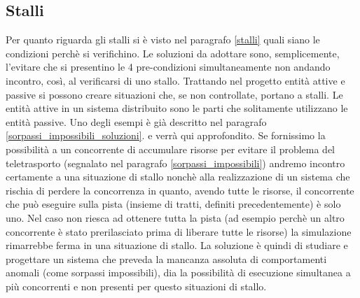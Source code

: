 \subsection{Stalli }
Per quanto riguarda gli stalli si \`{e} visto nel paragrafo \ref{stalli} quali
siano le condizioni perch\`{e} si verifichino. Le soluzioni da adottare sono,
semplicemente, l'evitare che si presentino le 4 pre-condizioni simultaneamente
non andando incontro, cos\`{i}, al verificarsi di uno stallo.
Trattando nel progetto entit\`{a} attive e passive si possono creare situazioni
che, se non controllate, portano a stalli. Le entit\`{a} attive in un sistema
distribuito sono le parti che solitamente utilizzano le entit\`{a} passive. Uno
degli esempi \`{e} gi\`{a} descritto nel paragrafo
\ref{sorpassi_impossibili_soluzioni}. e verr\`{a} qui approfondito. Se
fornissimo la possibilit\`{a} a un concorrente  di accumulare risorse per
evitare il problema del teletrasporto (segnalato nel paragrafo
\ref{sorpassi_impossibili}) andremo incontro certamente a una situazione di
stallo nonch\`{e} alla realizzazione di un sistema che rischia di perdere la
concorrenza in quanto, avendo tutte le risorse, il concorrente che pu\`{o}
eseguire sulla pista (insieme di tratti, definiti precedentemente) \`{e} solo
uno. Nel caso non riesca ad ottenere tutta la pista (ad esempio perch\`{e} un
altro concorrente \`{e} stato prerilasciato prima di liberare tutte le risorse)
la simulazione rimarrebbe ferma in una situazione di stallo. La soluzione \`{e}
quindi di studiare e progettare un sistema che preveda la mancanza assoluta di
comportamenti anomali (come sorpassi impossibili), dia la possibilit\`{a} di
esecuzione simultanea a pi\`{u} concorrenti e non presenti per questo situazioni
di stallo.
